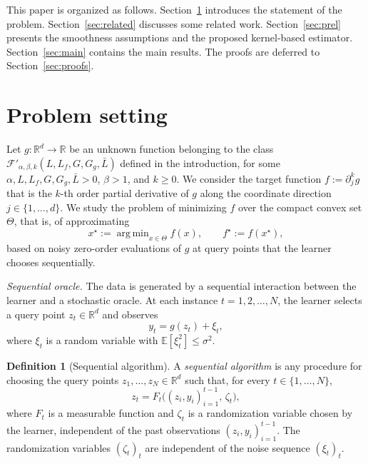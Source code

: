 \documentclass{article}
\renewcommand{\leq}{\leqslant}
\renewcommand{\geq}{\geqslant}
\renewcommand{\hat}{\widehat}
\newcommand{\argmin}{\mathop{\mathrm{arg}\,\mathrm{min}}}
\theoremstyle{definition}
\newtheorem{definition}{Definition}
\begin{document}
This paper is organized as follows. Section~\ref{sec:problem} introduces the statement of the problem. Section~\ref{sec:related} discusses some related work. Section~\ref{sec:prel} presents the
smoothness assumptions and the proposed kernel-based estimator. Section~\ref{sec:main} contains the main results.  The proofs are deferred to Section~\ref{sec:proofs}.



\section{Problem setting}
\label{sec:problem}

Let $g:\mathbb{R}^d\to\mathbb{R}$ be an unknown function 
belonging to the class 
$\mathcal{F}'_{\alpha,\beta,k}(L,L_f,G,G_g,\bar{L})$ defined in 
the introduction, for some $\alpha,L,L_f,G,G_g,\bar{L}>0$, 
$\beta>1$, and $k\geq 0$. We consider the target function  
$f:=\partial_j^k g$ that 
is the $k$-th order partial derivative of $g$ 
along the coordinate direction $j\in\{1,\dots,d\}$. We 
study the problem of minimizing $f$ over the compact convex 
set $\Theta$, that is, of approximating
\[
x^\star:=\argmin_{x\in\Theta}f(x),
\qquad
f^\star:=f(x^\star),
\]
based on noisy zero-order evaluations of $g$ at query points 
that the learner chooses sequentially.

\medskip
\noindent\textit{Sequential oracle.}
The data is generated by a sequential interaction between the
learner and a stochastic oracle. At each instance $t=1,2,\ldots,N$,
the learner selects a query point $z_t\in\mathbb{R}^d$ and
observes
\begin{equation}\label{observations}
 y_t = g(z_t)+\xi_t,   
\end{equation}
where $\xi_t$ is a random variable with $\mathbb{E}[\xi_t^2]\leq\sigma^2$.

\begin{definition}[Sequential algorithm]
\label{def:seq-alg}
A \emph{sequential algorithm} is any procedure for choosing the query
points $z_1,\dots,z_N\in\mathbb{R}^d$ such that, for every
$t\in\{1,\dots,N\}$,
\[
z_t=F_t\bigl((z_i,y_i)_{i=1}^{t-1},\,\zeta_t\bigr),
\]
where $F_t$ is a measurable function and $\zeta_t$ is a randomization
variable chosen by the learner, independent of the past observations
$(z_i,y_i)_{i=1}^{t-1}$. The randomization variables $(\zeta_t)_t$ are
independent of the noise sequence $(\xi_t)_t$. 
\end{definition}
\end{document}
